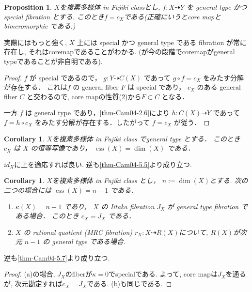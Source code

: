 \documentclass[dvipdfmx,a4paper,11pt]{article} %
\newtheorem{cor}[thm]{Corollary}
\newtheorem{prop}[thm]{Proposition}
\theoremstyle{definition}
\theoremstyle{remark}
\numberwithin{equation}{section}
\begin{document}
\begin{prop}\cite[Proposition 3.12]{Cam04}
\label{prop-Cam04-3.12}
$X$を複素多様体 in Fujiki classとし, 
$ f : X \dashrightarrow Y$ を general type かつ special fibration とする. 
このとき$f = c_X$である(正確にいうとcore mapとbimeromorphic である.)
\end{prop}
実際にはもっと強く,  $X$ 上には special かつ general type である fibration が常に存在し, それはcoremapであることがわかる. (が今の段階でcoremapがgeneral typeであることが非自明である).
\begin{proof}
$f$ が special であるので， $g : Y \dashrightarrow C(X)$ であって $g \circ f = c_X$ をみたす分解が存在する．
これは$f$ の general fiber $F$ は special であり， $c_X$ のある general fiber $C$ と交わるので, core mapの性質(2)から$F \subset C$ となる．

一方 $f$ は general type であり，\ref{thm-Cam04-2.6}により $h : C(X) \dashrightarrow Y$ であって $f = h \circ c_X$ をみたす分解が存在する．したがって $f = c_X$ が従う．
\end{proof}


\begin{cor}\cite[Corollary 3.14]{Cam04}
\label{cor-Cam04-3.14}
$X$を複素多様体 in Fujiki class でgeneral type とする．
このとき $c_X$ は $X$ の恒等写像であり， $\operatorname{ess}(X)=\dim(X)$ である．
\end{cor}
$id_X$に上を適応すれば良い. 
逆も\ref{thm-Cam04-5.5}より成り立つ. 

\begin{cor}\cite[Corollary 3.16]{Cam04}
$X$を複素多様体 in Fujiki class とし， $n := \dim(X)$とする. 
次の二つの場合には $\operatorname{ess}(X) = n-1$ である．
\begin{enumerate}
\item[(a)] $\kappa(X)=n-1$ であり， $X$ の Iitaka fibration $J_X$ が general type fibration である場合．
このとき $c_X = J_X$ である．
\item[(b)] $X$ の rational quotient (MRC fibration) $r_X : X \dashrightarrow R(X)$について, $R(X)$が次元 $n-1$ の general type である場合.
\end{enumerate}
\end{cor}
逆も\ref{thm-Cam04-5.7}より成り立つ. 
\begin{proof}
(a)の場合, $J_X$のfiberが$\kappa=0$でspecialである. 
よって, core mapは$J_X$を通るが, 次元勘定すれば$c_X = J_X$である. 
(b)も同じである. 
\end{proof}
\end{document}

